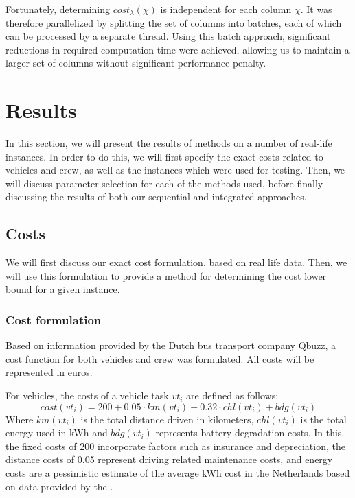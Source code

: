 \documentclass[]{article}
\begin{document}
Fortunately, determining $cost_\lambda(\chi)$ is independent for each column $\chi$. It was therefore parallelized by splitting the set of columns into batches, each of which can be processed by a separate thread. Using this batch approach, significant reductions in required computation time were achieved, allowing us to maintain a larger set of columns without significant performance penalty.

\section{Results}
In this section, we will present the results of methods on a number of real-life instances. In order to do this, we will first specify the exact costs related to vehicles and crew, as well as the instances which were used for testing. Then, we will discuss parameter selection for each of the methods used, before finally discussing the results of both our sequential and integrated approaches.

\subsection{Costs} \label{sec:results-costs}
We will first discuss our exact cost formulation, based on real life data. Then, we will use this formulation to provide a method for determining the cost lower bound for a given instance. 

\subsubsection{Cost formulation}
Based on information provided by the Dutch bus transport company Qbuzz, a cost function for both vehicles and crew was formulated. All costs will be represented in euros. 

For vehicles, the costs of a vehicle task $vt_i$ are defined as follows:
\begin{equation}
cost(vt_i) = 200 + 0.05 \cdot km(vt_i) + 0.32 \cdot chl(vt_i) + bdg(vt_i)  \nonumber
\end{equation}
Where $km(vt_i)$ is the total distance driven in kilometers, $chl(vt_i)$ is the total energy used in kWh and $bdg(vt_i)$ represents battery degradation costs. In this, the fixed costs of 200 incorporate factors such as insurance and depreciation, the distance costs of 0.05 represent driving related maintenance costs, and energy costs are a pessimistic estimate of the average kWh cost in the Netherlands based on data provided by the \citet{ANWB2025}.
\end{document}
